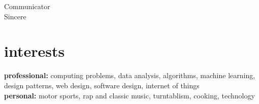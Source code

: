 \documentclass[]{friggeri-cv} %
\begin{document}
\begin{minipage}[t]{0.5\linewidth}
\begin{flushright}
 Communicator\quad{\color{blue} $\varheartsuit\varheartsuit\varheartsuit\varheartsuit\varheartsuit\varheartsuit\varheartsuit$}{\color{black} $\varheartsuit\varheartsuit\varheartsuit\varheartsuit\varheartsuit\varheartsuit\varheartsuit\varheartsuit$} \\

 Sincere\quad{\color{blue} $\varheartsuit\varheartsuit\varheartsuit\varheartsuit\varheartsuit\varheartsuit\varheartsuit\varheartsuit\varheartsuit\varheartsuit\varheartsuit\varheartsuit\varheartsuit$}{\color{black} $\varheartsuit\varheartsuit$}

 \end{flushright}

\end{minipage}\par\bigskip



\section{interests}

\textbf{professional:} computing problems, data analysis, algorithms, machine learning, design patterns, web design, software design, internet of things \\
\textbf{personal:} motor sports, rap and classic music, turntablism, cooking, technology
\end{document}
